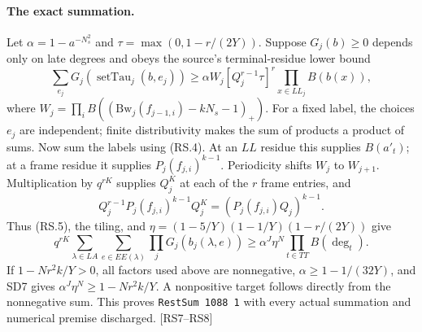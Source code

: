 \paragraph{The exact summation.}
Let $\alpha=1-a^{-N_s^2}$ and $\tau=\max(0,1-r/(2Y))$.
Suppose $G_j(b)\ge0$ depends only on late degrees and obeys the source's
terminal-residue lower bound
\[
 \sum_{e_j}G_j(\operatorname{setTau}_j(b,e_j))
 \ge\alpha W_j[Q_j^{r-1}\tau]^r\prod_{x\in LL_j}B(b(x)),
\]
where $W_j=\prod_i B((\mathrm{Bw}_j(f_{j-1,i})-kN_s-1)_+)$.
For a fixed label, the choices $e_j$ are independent; finite
distributivity makes the sum of products a product of sums.
Now sum the labels using (RS.4). At an $LL$ residue this supplies
$B(a'_t)$; at a frame residue it supplies $P_j(f_{j,i})^{k-1}$.
Periodicity shifts $W_j$ to $W_{j+1}$. Multiplication by $q^{rK}$
supplies $Q_j^K$ at each of the $r$ frame entries, and
\[
 Q_j^{r-1}P_j(f_{j,i})^{k-1}Q_j^K
   =(P_j(f_{j,i})Q_j)^{k-1}.
\]
Thus (RS.5), the tiling, and $\eta=(1-5/Y)(1-1/Y)(1-r/(2Y))$ give
\[
 q^{rK}\sum_{\lambda\in LA}\sum_{e\in EE(\lambda)}
       \prod_jG_j(b_j(\lambda,e))
 \ge\alpha^J\eta^N\prod_{t\in TT}B(\deg_t).
 \tag{RS.6}
\]
If $1-Nr^2k/Y>0$, all factors used above are nonnegative,
$\alpha\ge1-1/(32Y)$, and SD7 gives
$\alpha^J\eta^N\ge1-Nr^2k/Y$.
A nonpositive target follows directly from the nonnegative sum.
This proves \texttt{RestSum 1088 1} with every actual summation and
numerical premise discharged. \textsf{[RS7--RS8]}
